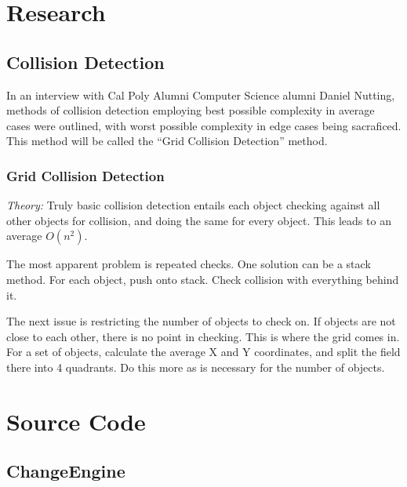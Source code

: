 \documentclass[12pt]{article}
\begin{document}
  \newpage

  \appendix
  \section{Research}

  \subsection{Collision Detection}
    In an interview with Cal Poly Alumni Computer Science alumni Daniel Nutting, methods of collision detection employing best possible complexity in average cases were outlined, with worst possible complexity in edge cases being sacraficed. This method will be called the ``Grid Collision Detection'' method.

    \subsubsection{Grid Collision Detection}
      \emph{Theory: } Truly basic collision detection entails each object checking against all other objects for collision, and doing the same for every object. This leads to an average $O(n^2)$.

      The most apparent problem is repeated checks. One solution can be a stack method. For each object, push onto stack. Check collision with everything behind it.

      The next issue is restricting the number of objects to check on. If objects are not close to each other, there is no point in checking. This is where the grid comes in. For a set of objects, calculate the average X and Y coordinates, and split the field there into 4 quadrants. Do this more as is necessary for the number of objects.

  \section{Source Code}
\subsection{ChangeEngine}
\end{document}

